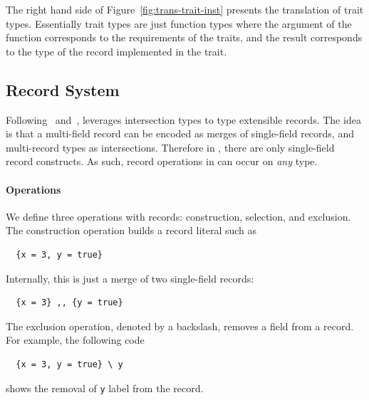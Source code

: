 The right hand side of Figure~\ref{fig:trans-trait-inst} presents the
translation of trait types. Essentially trait types are just function
types where the argument of the function corresponds to the requirements 
of the traits, and the result corresponds to the type of the record
implemented in the trait.

\subsection{Record System}

Following~\citet{reynolds1997design} and~\citet{castagna1995calculus}, \name
leverages intersection types to type extensible records. The idea is that a
multi-field record can be encoded as merges of single-field records, and
multi-record types as intersections. Therefore in \name, there are only
single-field record constructs. As such, record operations in \name can occur on
\textit{any} type.

\paragraph{Operations}
We define three operations with records: construction, selection, and exclusion.
The construction operation builds a record literal such as
\begin{lstlisting}
  {x = 3, y = true}
\end{lstlisting}
Internally, this is just a merge of two single-field records:
\begin{lstlisting}
  {x = 3} ,, {y = true}
\end{lstlisting}
The exclusion operation, denoted by a backslash, removes a field from a record.
For example, the following code
\begin{lstlisting}
  {x = 3, y = true} \ y
\end{lstlisting}
shows the removal of \lstinline{y} label from the record.

